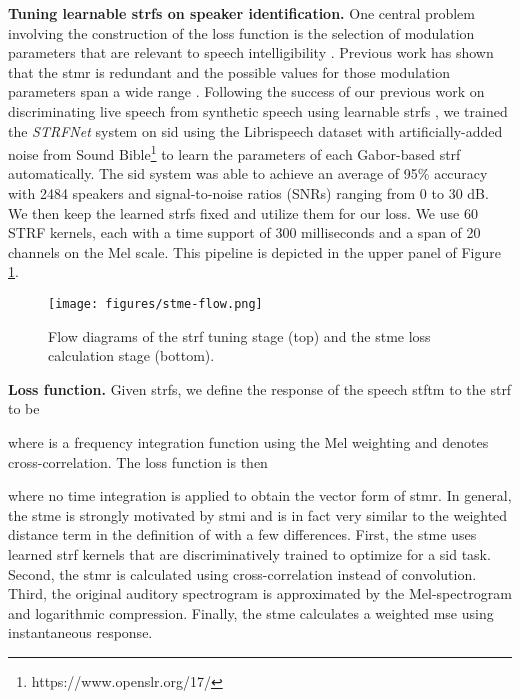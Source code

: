 \documentclass{article}
\newcommand{\fref}[1]{Figure \ref{#1}}		\newcommand{\eref}[1]{Eq. \eqref{#1}}
\begin{document}
\textbf{Tuning learnable \gls{strf}s on speaker identification.}
One central problem involving the construction of the loss function is the selection of modulation parameters that are relevant to speech intelligibility \cite{paytonMethodDetermineSpeech1999}. Previous work has shown that the \gls{stmr} is redundant \cite{mesgaraniDiscriminationSpeechNonspeech2006} and the possible values for those modulation parameters span a wide range \cite{meyerRobustnessSpectrotemporalFeatures2011,ravuriEasyDoesIt2012}. Following the success of our previous work on discriminating live speech from synthetic speech using learnable \gls{strf}s \cite{vuong2020learnable}, we  trained the \emph{STRFNet} system on \gls{sid} using the Librispeech \cite{panayotovLibrispeechASRCorpus2015} dataset
with artificially-added noise from Sound Bible\footnote{https://www.openslr.org/17/} to  learn the parameters of each Gabor-based \gls{strf} \cite{meyerRobustnessSpectrotemporalFeatures2011} automatically.  The \gls{sid} system was able to achieve an average of 95\% accuracy with 2484 speakers and signal-to-noise ratios (SNRs) ranging from 0 to 30 dB.  We then keep the learned \gls{strf}s fixed and utilize them for our loss.  We use 60 STRF kernels,  each with a time support of 300 milliseconds and a span of 20 channels on the Mel scale. This pipeline is depicted in the upper panel of \fref{fig:stme}.

\begin{figure}[htb]
\centering
\texttt{[image: figures/stme-flow.png]}
\caption{Flow diagrams of the \gls{strf} tuning stage (top) and the \gls{stme} loss calculation stage (bottom).}
\label{fig:stme}
\vspace{-4mm}

\end{figure}

\textbf{Loss function.}
Given  \gls{strf}s, we define the response of the speech \gls{stftm} to the  \gls{strf} to be

where  is a frequency integration function using the Mel weighting and  denotes cross-correlation. The loss function is then

where no time integration is applied to obtain the vector form of \gls{stmr}.
In general, the \gls{stme} is strongly motivated by \gls{stmi} and is in fact very similar to the weighted distance term in the definition of  with a few differences. First, the \gls{stme} uses learned \gls{strf} kernels that are discriminatively trained to optimize for a \gls{sid} task. Second, the \gls{stmr} is calculated using cross-correlation instead of convolution. Third, the original auditory spectrogram \cite{chiMultiresolutionSpectrotemporalAnalysis2005} is approximated by the Mel-spectrogram and logarithmic compression. Finally, the \gls{stme} calculates a weighted \gls{mse} using instantaneous response. 
\end{document}

